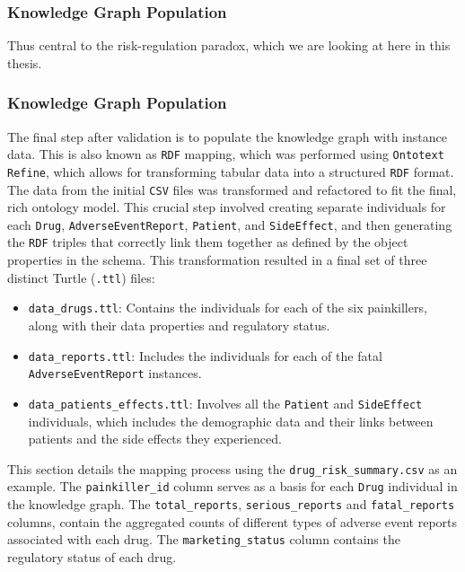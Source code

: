 \subsubsection{Knowledge Graph Population}
Thus central to the risk-regulation paradox, which we are looking at here in this thesis.

\subsubsection{Knowledge Graph Population}
The final step after validation is to populate the knowledge graph with instance data. This is also known as \texttt{RDF} mapping, which was performed using \texttt{Ontotext Refine}, which allows for transforming tabular data into a structured \texttt{RDF} format. The data from the initial \texttt{CSV} files was  transformed and refactored to fit the final, rich ontology model. This crucial step involved creating separate individuals for each \texttt{Drug}, \texttt{Adverse\-Event\-Report}, \texttt{Patient}, and \texttt{Side\-Effect}, and then generating the \texttt{RDF} triples that correctly link them together as defined by the object properties in the schema. This transformation resulted in a final set of three distinct Turtle (\texttt{.ttl}) files:
\begin{itemize}
    \item \nolinkurl{data_drugs.ttl}: Contains the individuals for each of the six painkillers, along with their data properties and regulatory status.
    \item \nolinkurl{data_reports.ttl}: Includes the individuals for each of the fatal \texttt{Adverse\-Event\-Report} instances.
    \item \nolinkurl{data_patients_effects.ttl}: Involves all the \texttt{Patient} and \texttt{Side\-Effect} individuals, which includes the demographic data and their links between patients and the side effects they experienced.
\end{itemize}
This section details the mapping process using the \nolinkurl{drug_risk_summary.csv} as an example. The \texttt{painkiller\_id} column serves as a basis for each \texttt{Drug} individual in the knowledge graph. The \texttt{total\_reports}, \texttt{serious\_reports} and \texttt{fatal\_reports} columns, contain the aggregated counts of different types of adverse event reports associated with each drug. The \texttt{marketing\_status} column contains the regulatory status of each drug.

